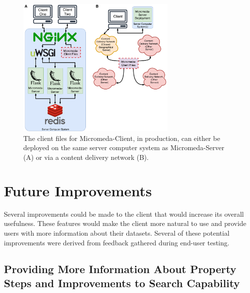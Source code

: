 \begin{figure}[!ht]
  \centering
	\includegraphics[width=0.7\textwidth]{media/micromeda-client-deployment.pdf}
	 \caption{The client files for Micromeda-Client, in production, can either be deployed on the same server computer system as Micromeda-Server (A) or via a content delivery network (B).}
	 \label{fig:client-deployment}
\end{figure}

\section{Future Improvements} \label{client-improvements}

Several improvements could be made to the client that would increase its overall usefulness. These features would make the client more natural to use and provide users with more information about their datasets. Several of these potential improvements were derived from feedback gathered during end-user testing.

\subsection{Providing More Information About Property Steps and Improvements to Search Capability}

